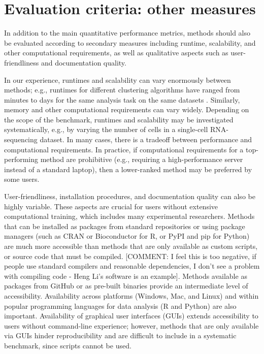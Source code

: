 \documentclass[12pt, a4paper]{article}
\begin{document}
\section*{Evaluation criteria: other measures}

In addition to the main quantitative performance metrics, methods should also be evaluated according to secondary measures including runtime, scalability, and other computational requirements, as well as qualitative aspects such as user-friendliness and documentation quality.

In our experience, runtimes and scalability can vary enormously between methods; e.g., runtimes for different clustering algorithms have ranged from minutes to days for the same analysis task on the same datasets \citep{Weber2016}. Similarly, memory and other computational requirements can vary widely. Depending on the scope of the benchmark, runtimes and scalability may be investigated systematically, e.g., by varying the number of cells in a single-cell RNA-sequencing dataset. In many cases, there is a tradeoff between performance and computational requirements. In practice, if computational requirements for a top-performing method are prohibitive (e.g., requiring a high-performance server instead of a standard laptop), then a lower-ranked method may be preferred by some users.

User-friendliness, installation procedures, and documentation quality can also be highly variable. These aspects are crucial for users without extensive computational training, which includes many experimental researchers. Methods that can be installed as packages from standard repositories or using package managers (such as CRAN or Bioconductor for R, or PyPI and pip for Python) are much more accessible than methods that are only available as custom scripts, or source code that must be compiled. [COMMENT: I feel this is too negative, if people use standard compilers and reasonable dependencies, I don't see a problem with compiling code - Heng Li's software is an example]. Methods available as packages from GitHub or as pre-built binaries provide an intermediate level of accessibility. Availability across platforms (Windows, Mac, and Linux) and within popular programming languages for data analysis (R and Python) are also important. Availability of graphical user interfaces (GUIs) extends accessibility to users without command-line experience; however, methods that are only available via GUIs hinder reproducibility and are difficult to include in a systematic benchmark, since scripts cannot be used.
\end{document}
